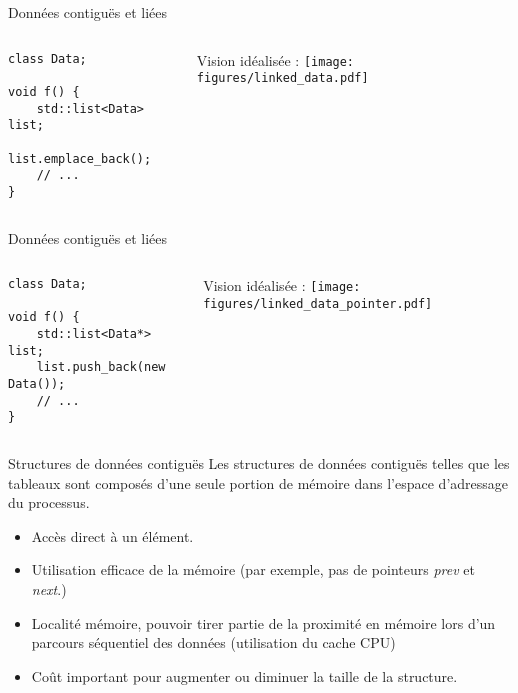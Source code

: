 \documentclass[handout]{beamer}
\let\emph\relax %
\begin{document}
\begin{frame}[fragile]{Données contiguës et liées}
	\vfill
	\begin{columns}
		\begin{column}{0.35\textwidth}
			\begin{lstlisting}
class Data;

void f() {
    std::list<Data> list;
    list.emplace_back();
    // ...
}
			\end{lstlisting}
		\end{column}
		\begin{column}{0.55\textwidth}
			\begin{center}
				Vision idéalisée :
				\texttt{[image: figures/linked\_data.pdf]}
			\end{center}
		\end{column}
	\end{columns}    
	\vfill
\end{frame}

\begin{frame}[fragile]{Données contiguës et liées}
	\vfill
	\begin{columns}
		\begin{column}{0.35\textwidth}
			\begin{lstlisting}
class Data;

void f() {
    std::list<Data*> list;
    list.push_back(new Data());
    // ...
}
			\end{lstlisting}
		\end{column}
		\begin{column}{0.55\textwidth}
			\begin{center}
				Vision idéalisée :
				\texttt{[image: figures/linked\_data\_pointer.pdf]}
			\end{center}
		\end{column}
	\end{columns}    
	\vfill
\end{frame}

\begin{frame}[fragile]{Structures de données contiguës}
	Les structures de données contiguës telles que les tableaux sont composés d'une seule portion de mémoire dans l'espace d'adressage du processus.\\
	\vfill
	\emph{Avantages:}
	\begin{itemize}
		\item Accès direct à un élément.
		\item Utilisation efficace de la mémoire (par exemple, pas de pointeurs \textit{prev} et \textit{next}.)
		\item Localité mémoire, pouvoir tirer partie de la proximité en mémoire lors d'un parcours séquentiel des données (utilisation du cache CPU)
	\end{itemize}
	\emph{Désavantage:}
	\begin{itemize}
		\item Coût important pour augmenter ou diminuer la taille de la structure.
	\end{itemize}
\end{frame}
\end{document}
